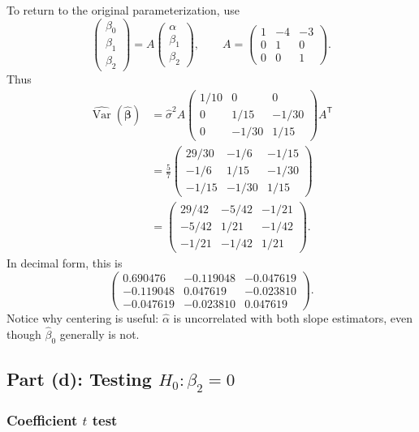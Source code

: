 \documentclass[11pt]{article}
\newcommand{\trans}{\mathsf T}
\newcommand{\Var}{\operatorname{Var}}
\newcommand{\answer}[1]{\boxed{\displaystyle #1}}
\begin{document}
To return to the original parameterization, use
\[
\begin{pmatrix}\beta_0\\\beta_1\\\beta_2\end{pmatrix}
=A\begin{pmatrix}\alpha\\\beta_1\\\beta_2\end{pmatrix},
\qquad
A=
\begin{pmatrix}
1&-4&-3\\
0&1&0\\
0&0&1
\end{pmatrix}.
\]
Thus
\begin{align*}
\widehat{\Var}(\hat{\bm\beta})
&=\hat\sigma^2 A
\begin{pmatrix}
1/10&0&0\\
0&1/15&-1/30\\
0&-1/30&1/15
\end{pmatrix}A^\trans\\
&=\frac57
\begin{pmatrix}
29/30&-1/6&-1/15\\
-1/6&1/15&-1/30\\
-1/15&-1/30&1/15
\end{pmatrix}\\
&=\answer{
\begin{pmatrix}
29/42&-5/42&-1/21\\
-5/42&1/21&-1/42\\
-1/21&-1/42&1/21
\end{pmatrix}}.
\end{align*}
In decimal form, this is
\[
\begin{pmatrix}
0.690476&-0.119048&-0.047619\\
-0.119048&0.047619&-0.023810\\
-0.047619&-0.023810&0.047619
\end{pmatrix}.
\]
Notice why centering is useful: \(\hat\alpha\) is uncorrelated with both
slope estimators, even though \(\hat\beta_0\) generally is not.

\subsection{Part (d): Testing \(H_0:\beta_2=0\)}

\subsubsection{Coefficient \(t\) test}
\end{document}
